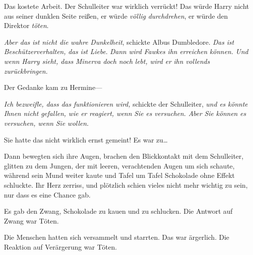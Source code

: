 Das kostete Arbeit. Der Schulleiter war wirklich verrückt! Das würde Harry nicht aus seiner dunklen Seite reißen, er würde \emph{völlig durchdrehen}, er würde den Direktor \emph{töten}.

\emph{Aber das ist nicht die wahre Dunkelheit}, schickte Albus Dumbledore. \emph{Das ist Beschützerverhalten, das ist Liebe}. \emph{Dann wird Fawkes ihn erreichen können. Und wenn Harry sieht, dass Minerva doch noch lebt, wird er ihn vollends zurückbringen.}

Der Gedanke kam zu Hermine—

\emph{Ich bezweifle, dass das funktionieren wird,} schickte der Schulleiter, \emph{und es könnte Ihnen nicht gefallen, wie er reagiert, wenn Sie es versuchen. Aber Sie können es versuchen, wenn Sie wollen.}

Sie hatte das nicht wirklich ernst gemeint! Es war zu…

Dann bewegten sich ihre Augen, brachen den Blickkontakt mit dem Schulleiter, glitten zu dem Jungen, der mit leeren, verachtenden Augen um sich schaute, während sein Mund weiter kaute und Tafel um Tafel Schokolade ohne Effekt schluckte.
Ihr Herz zerriss, und plötzlich schien vieles nicht mehr wichtig zu sein, nur dass es eine Chance gab.

\later

Es gab den Zwang, Schokolade zu kauen und zu schlucken. Die Antwort auf Zwang war Töten.

Die Menschen hatten sich versammelt und starrten. Das war ärgerlich. Die Reaktion auf Verärgerung war Töten.

